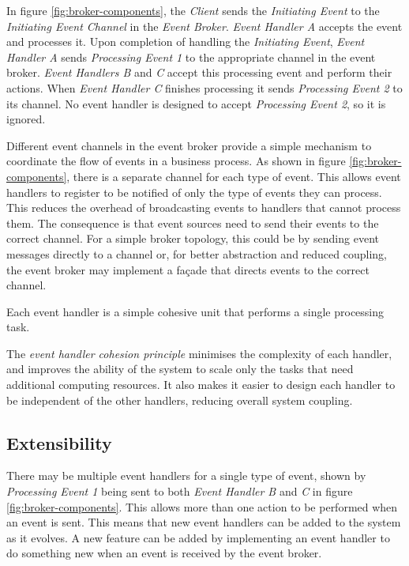 In figure \ref{fig:broker-components}, the \emph{Client} sends the \emph{Initiating Event} to the \emph{Initiating Event Channel} in the \emph{Event Broker}.
\emph{Event Handler A} accepts the event and processes it.
Upon completion of handling the \emph{Initiating Event},
\emph{Event Handler A} sends \emph{Processing Event 1} to the appropriate channel in the event broker.
\emph{Event Handlers B} and \emph{C} accept this processing event and perform their actions.
When \emph{Event Handler C} finishes processing it sends \emph{Processing Event 2} to its channel.
No event handler is designed to accept \emph{Processing Event 2}, so it is ignored.

Different event channels in the event broker provide a simple mechanism to coordinate the flow of events in a business process.
As shown in figure \ref{fig:broker-components}, there is a separate channel for each type of event.
This allows event handlers to register to be notified of only the type of events they can process.
This reduces the overhead of broadcasting events to handlers that cannot process them.
The consequence is that event sources need to send their events to the correct channel.
For a simple broker topology, this could be by sending event messages directly to a channel
or, for better abstraction and reduced coupling, the event broker may implement a façade that directs events to the correct channel.

\vspace{1mm}
\begin{definition}\label{def:cohesion}
    Each event handler is a simple cohesive unit that performs a single processing task.
\end{definition}

The \emph{event handler cohesion principle} minimises the complexity of each handler,
and improves the ability of the system to scale only the tasks that need additional computing resources.
It also makes it easier to design each handler to be independent of the other handlers, reducing overall system coupling.

\subsection{Extensibility}\label{sec:extensibility}

There may be multiple event handlers for a single type of event,
shown by \emph{Processing Event 1} being sent to both \emph{Event Handler B} and \emph{C} in figure \ref{fig:broker-components}.
This allows more than one action to be performed when an event is sent.
This means that new event handlers can be added to the system as it evolves.
A new feature can be added by implementing an event handler to do something new when an event is received by the event broker.

